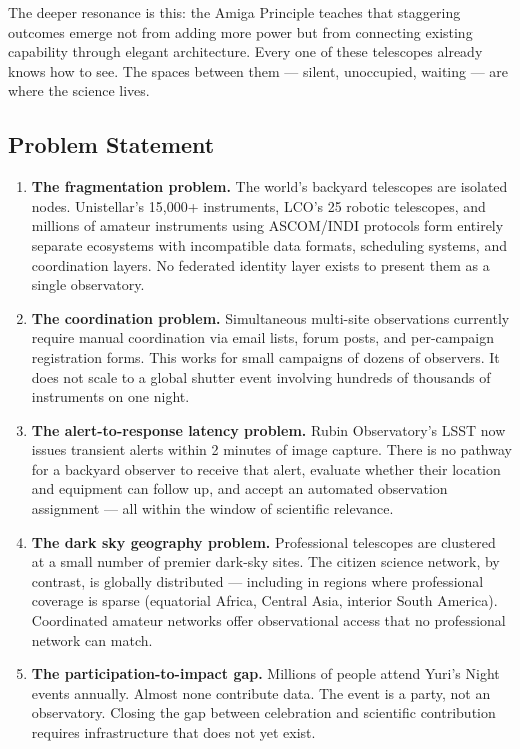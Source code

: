 \documentclass[11pt,letterpaper]{article}
\begin{document}
The deeper resonance is this: the Amiga Principle teaches that staggering outcomes emerge not from adding more power but from connecting existing capability through elegant architecture. Every one of these telescopes already knows how to see. The spaces between them --- silent, unoccupied, waiting --- are where the science lives.

\subsection{Problem Statement}

\begin{enumerate}
  \item \textbf{The fragmentation problem.} The world's backyard telescopes are isolated nodes. Unistellar's 15,000+ instruments, LCO's 25 robotic telescopes, and millions of amateur instruments using ASCOM/INDI protocols form entirely separate ecosystems with incompatible data formats, scheduling systems, and coordination layers. No federated identity layer exists to present them as a single observatory.

  \item \textbf{The coordination problem.} Simultaneous multi-site observations currently require manual coordination via email lists, forum posts, and per-campaign registration forms. This works for small campaigns of dozens of observers. It does not scale to a global shutter event involving hundreds of thousands of instruments on one night.

  \item \textbf{The alert-to-response latency problem.} Rubin Observatory's LSST now issues transient alerts within 2 minutes of image capture. There is no pathway for a backyard observer to receive that alert, evaluate whether their location and equipment can follow up, and accept an automated observation assignment --- all within the window of scientific relevance.

  \item \textbf{The dark sky geography problem.} Professional telescopes are clustered at a small number of premier dark-sky sites. The citizen science network, by contrast, is globally distributed --- including in regions where professional coverage is sparse (equatorial Africa, Central Asia, interior South America). Coordinated amateur networks offer observational access that no professional network can match.

  \item \textbf{The participation-to-impact gap.} Millions of people attend Yuri's Night events annually. Almost none contribute data. The event is a party, not an observatory. Closing the gap between celebration and scientific contribution requires infrastructure that does not yet exist.
\end{enumerate}
\end{document}
